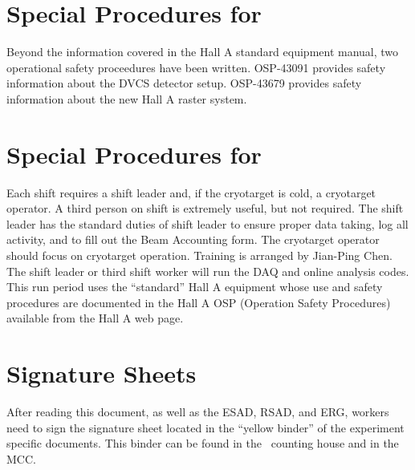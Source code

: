 %
\newpage
\section{Special Procedures for \HALL}

Beyond the information covered in the Hall A standard equipment manual,
two operational safety proceedures have been written.
OSP-43091
provides safety information about the DVCS detector setup.  OSP-43679 provides
safety information about the new Hall A raster system.

%
\newpage
\section{Special Procedures for \EXPTS}

Each shift requires a shift leader and, if the cryotarget is cold, a cryotarget 
operator.  A third person on shift is extremely useful, but not required. The shift leader 
has the standard
duties of shift leader to ensure proper data taking, log all activity, and to fill out
the Beam Accounting form. The cryotarget operator should focus on cryotarget
operation. Training is arranged by Jian-Ping Chen. The shift leader or third
shift worker will run the DAQ and online analysis codes.
This run period uses the ``standard'' Hall A equipment whose
use and safety procedures are documented in the Hall A OSP (Operation Safety
Procedures) available from the Hall A web page.

\newpage
\section{Signature Sheets}

After reading this document, as well as the ESAD, RSAD, and ERG, workers need to sign
the signature sheet located in the ``yellow binder'' of the experiment specific documents.
This binder can be found in the \HALL\ counting house and in the MCC.

